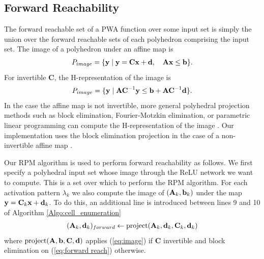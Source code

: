 \subsection{Forward Reachability} \label{Forward}
The forward reachable set of a PWA function over some input set is simply the union over the forward reachable sets of each polyhedron comprising the input set. The image of a polyhedron under an affine map is
\begin{align}
    P_{image} = \{\mathbf{y} \mid \mathbf{y}=\mathbf{Cx}+\mathbf{d},\quad \mathbf{Ax} \le \mathbf{b}\}. \label{eq:forward reach}
\end{align}
For invertible $\mathbf{C}$, the H-representation of the image is
\begin{align}
    P_{image} = \{\mathbf{y} \mid \mathbf{AC}^{-1}\mathbf{y} \le \mathbf{b} + \mathbf{AC}^{-1} \mathbf{d}\}. \label{eq:image}
\end{align}
In the case the affine map is not invertible, more general polyhedral projection methods such as block elimination, Fourier-Motzkin elimination, or parametric linear programming can compute the H-representation of the image \cite{cdd_manual, mpLP}. 
Our implementation uses the block elimination projection in the case of a non-invertible affine map \cite{cdd}.

Our RPM algorithm is used to perform forward reachability as follows. We first specify a polyhedral input set whose image through the ReLU network we want to compute.  This is a set over which to perform the RPM algorithm. For each activation pattern $\lambda_k$ we also compute the image of $(\mathbf{A}_k, \mathbf{b}_k)$ under the map $\mathbf{y} = \mathbf{C}_k\mathbf{x} + \mathbf{d}_k$. To do this, an additional line is introduced between lines 9 and 10 of Algorithm \ref{Algo:cell_enumeration}
\begin{align}
    (\mathbf{A}_k, \mathbf{d}_k)_{forward} \leftarrow \text{project}(\mathbf{A}_k, \mathbf{d}_k, \mathbf{C}_k, \mathbf{d}_k)
\end{align}
where $\text{project}(\mathbf{A}, \mathbf{b}, \mathbf{C}, \mathbf{d})$ applies (\ref{eq:image}) if $\mathbf{C}$ invertible and block elimination on (\ref{eq:forward reach}) otherwise.


